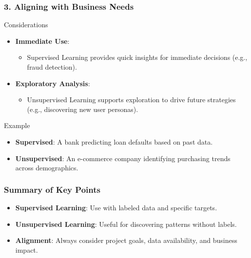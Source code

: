 \documentclass[aspectratio=169]{beamer}
\begin{document}
\begin{frame}[fragile]
    \frametitle{3. Aligning with Business Needs}
    \begin{block}{Considerations}
        \begin{itemize}
            \item \textbf{Immediate Use}:
                \begin{itemize}
                    \item Supervised Learning provides quick insights for immediate decisions (e.g., fraud detection).
                \end{itemize}
            \item \textbf{Exploratory Analysis}:
                \begin{itemize}
                    \item Unsupervised Learning supports exploration to drive future strategies (e.g., discovering new user personas).
                \end{itemize}
        \end{itemize}
    \end{block}
    
    \begin{block}{Example}
        \begin{itemize}
            \item \textbf{Supervised}: A bank predicting loan defaults based on past data.
            \item \textbf{Unsupervised}: An e-commerce company identifying purchasing trends across demographics.
        \end{itemize}
    \end{block}
\end{frame}

\begin{frame}[fragile]
    \frametitle{Summary of Key Points}
    \begin{block}{}
        \begin{itemize}
            \item \textbf{Supervised Learning}: Use with labeled data and specific targets.
            \item \textbf{Unsupervised Learning}: Useful for discovering patterns without labels.
            \item \textbf{Alignment}: Always consider project goals, data availability, and business impact.
        \end{itemize}
    \end{block}
\end{frame}
\end{document}
